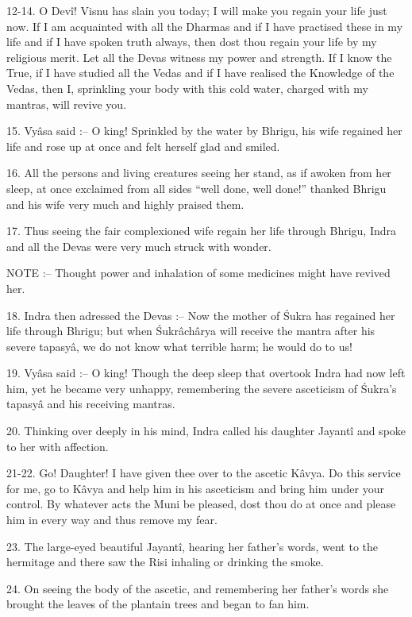 12-14. O Dev\^i! Visnu has slain you today; I will make you regain your life just now. If I am acquainted with all the Dharmas and if I have practised these in my life and if I have spoken truth always, then dost thou regain your life by my religious merit. Let all the Devas witness my power and strength. If I know the True, if I have studied all the Vedas and if I have realised the Knowledge of the Vedas, then I, sprinkling your body with this cold water, charged with my mantras, will revive you.

15. Vy\^asa said :-- O king! Sprinkled by the water by Bhrigu, his wife regained her life and rose up at once and felt herself glad and smiled.

16. All the persons and living creatures seeing her stand, as if awoken from her sleep, at once exclaimed from all sides ``well done, well done!'' thanked Bhrigu and his wife very much and highly praised them.

17. Thus seeing the fair complexioned wife regain her life through Bhrigu, Indra and all the Devas were very much struck with wonder.

NOTE :-- Thought power and inhalation of some medicines might have revived her.

18. Indra then adressed the Devas :-- Now the mother of \'Sukra has regained her life through Bhrigu; but when \'Sukr\^ach\^arya will receive the mantra after his severe tapasy\^a, we do not know what terrible harm; he would do to us!

19. Vy\^asa said :-- O king! Though the deep sleep that overtook Indra had now left him, yet he became very unhappy, remembering the severe asceticism of \'Sukra's tapasy\^a and his receiving mantras.

20. Thinking over deeply in his mind, Indra called his daughter Jayant\^i and spoke to her with affection.

21-22. Go! Daughter! I have given thee over to the ascetic K\^avya. Do this service for me, go to K\^avya and help him in his asceticism and bring him under your control. By whatever acts the Muni be pleased, dost thou do at once and please him in every way and thus remove my fear.

23. The large-eyed beautiful Jayant\^i, hearing her father's words, went to the hermitage and there saw the Risi inhaling or drinking the smoke.

24. On seeing the body of the ascetic, and remembering her father's words she brought the leaves of the plantain trees and began to fan him.

